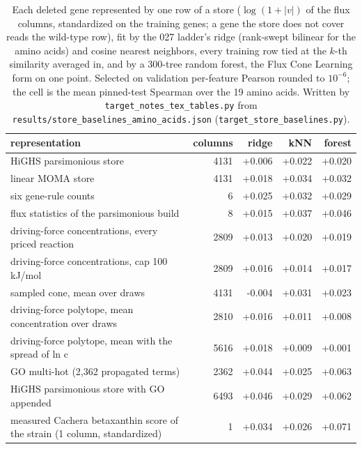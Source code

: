 \begin{table}[H]
  \centering
  \footnotesize
  \caption[CPU baselines over the store representations]{Each deleted gene represented by one row of a store ($\log(1+|v|)$ of the flux columns, standardized on the training genes; a gene the store does not cover reads the wild-type row), fit by the 027 ladder's ridge (rank-swept bilinear for the amino acids) and cosine nearest neighbors, every training row tied at the $k$-th similarity averaged in, and by a 300-tree random forest, the Flux Cone Learning form on one point. Selected on validation per-feature Pearson rounded to $10^{-6}$; the cell is the mean pinned-test Spearman over the 19 amino acids. Written by \texttt{target\_notes\_tex\_tables.py} from \texttt{results/store\_baselines\_amino\_acids.json} (\texttt{target\_store\_baselines.py}).}
  \label{tab:store-baselines}
  \begin{tabular}{@{}lrrrr@{}}
    \hline
    representation & columns & ridge & kNN & forest \\
    \hline
    HiGHS parsimonious store & 4131 & +0.006 & +0.022 & +0.020 \\
    linear MOMA store & 4131 & +0.018 & +0.034 & +0.032 \\
    six gene-rule counts & 6 & +0.025 & +0.032 & +0.029 \\
    flux statistics of the parsimonious build & 8 & +0.015 & +0.037 & +0.046 \\
    driving-force concentrations, every priced reaction & 2809 & +0.013 & +0.020 & +0.019 \\
    driving-force concentrations, cap 100 kJ/mol & 2809 & +0.016 & +0.014 & +0.017 \\
    sampled cone, mean over draws & 4131 & -0.004 & +0.031 & +0.023 \\
    driving-force polytope, mean concentration over draws & 2810 & +0.016 & +0.011 & +0.008 \\
    driving-force polytope, mean with the spread of ln c & 5616 & +0.018 & +0.009 & +0.001 \\
    GO multi-hot (2,362 propagated terms) & 2362 & +0.044 & +0.025 & +0.063 \\
    HiGHS parsimonious store with GO appended & 6493 & +0.046 & +0.029 & +0.062 \\
    measured Cachera betaxanthin score of the strain (1 column, standardized) & 1 & +0.034 & +0.026 & +0.071 \\

\end{tabular}
\end{table}

